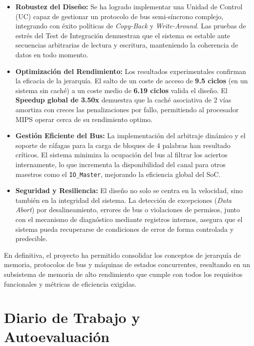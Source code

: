 \documentclass[12pt,a4paper]{article}
\begin{document}
    \begin{itemize}[leftmargin=1.5em]
        \item \textbf{Robustez del Diseño:} Se ha logrado implementar una Unidad de Control (UC) capaz de gestionar un protocolo de bus semi-síncrono complejo, integrando con éxito políticas de \textit{Copy-Back} y \textit{Write-Around}. Las pruebas de estrés del Test de Integración demuestran que el sistema es estable ante secuencias arbitrarias de lectura y escritura, manteniendo la coherencia de datos en todo momento.
        
        \item \textbf{Optimización del Rendimiento:} Los resultados experimentales confirman la eficacia de la jerarquía. El salto de un coste de acceso de \textbf{9.5 ciclos} (en un sistema sin caché) a un coste medio de \textbf{6.19 ciclos} valida el diseño. El \textbf{Speedup global de 3.50x} demuestra que la caché asociativa de 2 vías amortiza con creces las penalizaciones por fallo, permitiendo al procesador MIPS operar cerca de su rendimiento optimo.
        
        \item \textbf{Gestión Eficiente del Bus:} La implementación del arbitraje dinámico y el soporte de ráfagas para la carga de bloques de 4 palabras han resultado críticos. El sistema minimiza la ocupación del bus al filtrar los aciertos internamente, lo que incrementa la disponibilidad del canal para otros maestros como el \texttt{IO\_Master}, mejorando la eficiencia global del SoC.
        
        \item \textbf{Seguridad y Resiliencia:} El diseño no solo se centra en la velocidad, sino también en la integridad del sistema. La detección de excepciones (\textit{Data Abort}) por desalineamiento, errores de bus o violaciones de permisos, junto con el mecanismo de diagnóstico mediante registros internos, asegura que el sistema pueda recuperarse de condiciones de error de forma controlada y predecible.
    \end{itemize}

    En definitiva, el proyecto ha permitido consolidar los conceptos de jerarquía de memoria, protocolos de bus y máquinas de estados concurrentes, resultando en un subsistema de memoria de alto rendimiento que cumple con todos los requisitos funcionales y métricas de eficiencia exigidas.

\newpage
    \section{Diario de Trabajo y Autoevaluación}
\end{document}

